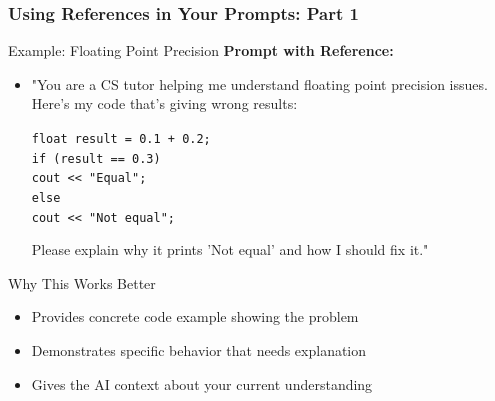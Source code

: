 \documentclass{beamer}
\begin{document}
\begin{frame}
\frametitle{Using References in Your Prompts: Part 1}
\begin{block}{Example: Floating Point Precision}
\textbf{Prompt with Reference:}
\begin{itemize}
\item "You are a CS tutor helping me understand floating point precision issues. Here's my code that's giving wrong results:

\texttt{float result = 0.1 + 0.2;}\\
\texttt{if (result == 0.3)}\\
\texttt{\quad cout << "Equal";}\\
\texttt{else}\\
\texttt{\quad cout << "Not equal";}

Please explain why it prints 'Not equal' and how I should fix it."
\end{itemize}
\end{block}

\begin{alertblock}{Why This Works Better}
\begin{itemize}
\item Provides concrete code example showing the problem
\item Demonstrates specific behavior that needs explanation
\item Gives the AI context about your current understanding
\end{itemize}
\end{alertblock}
\end{frame}
\end{document}
